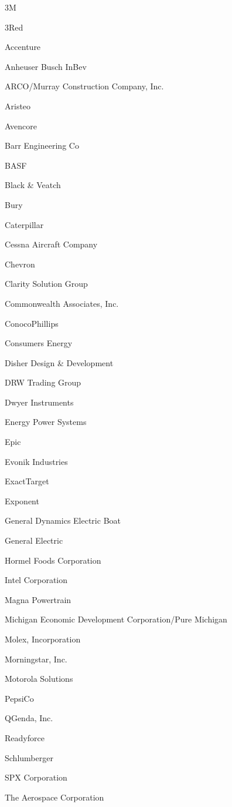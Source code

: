 \documentclass[twoside]{article}
\begin{document}
\begin{center}
\begin{multicols}{5}
\begin{FlushLeft}
\begin{compactitem}
        \item 3M
\item 3Red
\item Accenture
\item Anheuser Busch InBev
\item ARCO/Murray Construction Company, Inc.
\item Aristeo
\item Avencore
\item Barr Engineering Co
\item BASF
\item Black \& Veatch
\item Bury
\item Caterpillar
\item Cessna Aircraft Company
\item Chevron
\item Clarity Solution Group
\item Commonwealth Associates, Inc.
\item ConocoPhillips
\item Consumers Energy
\item Disher Design \& Development
\item DRW Trading Group
\item Dwyer Instruments
\item Energy Power Systems
\item Epic
\item Evonik Industries
\item ExactTarget
\item Exponent
\item General Dynamics Electric Boat
\item General Electric
\item Hormel Foods Corporation
\item Intel Corporation
\item Magna Powertrain
\item Michigan Economic Development Corporation/Pure Michigan
\item Molex, Incorporation
\item Morningstar, Inc.
\item Motorola Solutions
\item PepsiCo
\item QGenda, Inc.
\item Readyforce
\item Schlumberger
\item SPX Corporation
\item The Aerospace Corporation

\end{compactitem}
\end{FlushLeft}
\end{multicols}
\end{center}
\end{document}
